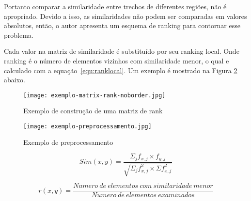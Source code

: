 Portanto comparar a similaridade entre trechos de diferentes regiões, não é apropriado.
Devido a isso, as similaridades não podem ser comparadas em valores absolutos,  então, o autor apresenta um esquema de ranking para contornar esse problema.
%

Cada valor na matriz de similaridade é substituído por seu ranking local. Onde ranking é o número de elementos vizinhos com similaridade menor, o qual e calculado com a equação~\ref{equ:ranklocal}. Um exemplo é mostrado na Figura \ref{fig:exemplomatrixrank} abaixo.



  \begin{figure}[!h]

	\centering
	\texttt{[image: exemplo-matrix-rank-noborder.jpg]}
	\caption{Exemplo de construção de uma matriz de rank}
	\label{fig:exemplomatrixrank}

  \end{figure}


  \begin{figure}[!h]

	\centering
	\texttt{[image: exemplo-preprocessamento.jpg]}
	\caption{Exemplo de preprocessamento}
	\label{fig:exemplomatrixrank}

  \end{figure}




\begin{equation}
Sim(x,y) = \frac
{\Sigma_j f_{x,j} \times f_{y,j}}
{\sqrt{\Sigma_j f^2_{x,j} \times \Sigma f^2_{x,j}}}
\label{equ:cosine}
\end{equation}



\begin{equation}
r(x,y) = \frac
{Numero\ de\ elementos\ com\ similaridade\ menor}
{Numero\ de\ elementos\ examinados}
\label{equ:ranklocal}
\end{equation}












